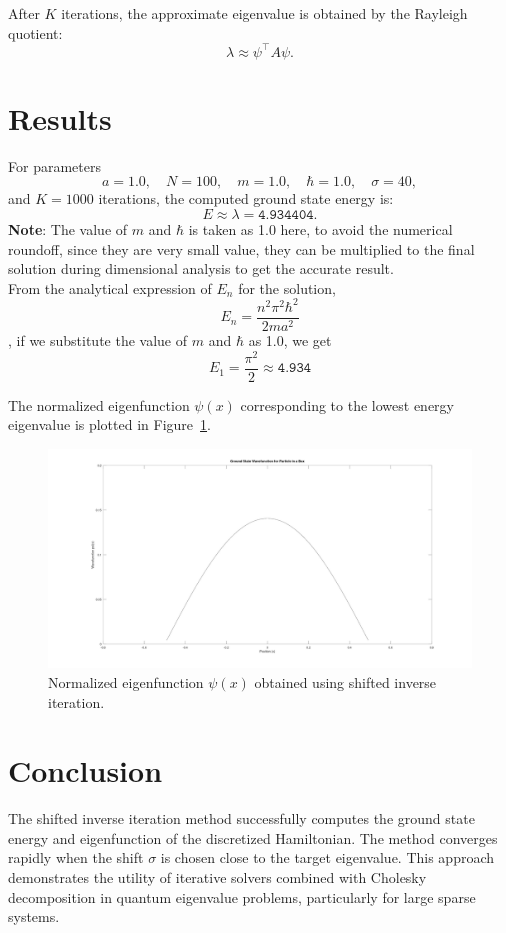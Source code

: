 After $K$ iterations, the approximate eigenvalue is obtained by the Rayleigh quotient:
\[
  \lambda \approx \psi^\top A \psi.
\]

\section*{Results}
For parameters
\[
a = 1.0, \quad N = 100, \quad m = 1.0, \quad \hbar = 1.0, \quad \sigma = 40,
\]
and $K = 1000$ iterations, the computed ground state energy is:
\[
  E \approx \lambda = \texttt{4.934404}.
\]
\textbf{Note}: The value of $m$ and $\hbar$ is taken as 1.0 here, to avoid the numerical roundoff, since they are very small value, they can be multiplied to the final solution during dimensional analysis to get the accurate result. \\
\vspace{10pt}
From the analytical expression of $E_{n}$ for the solution,
\[
  E_{n} = \frac{n^{2}\pi^{2}\hbar^{2}}{2ma^{2}}
\]
, if we substitute the value of $m$ and $\hbar$ as 1.0, we get
\[
  E_{1} = \frac{\pi^{2}}{2} \approx \texttt{4.934}
\]

The normalized eigenfunction $\psi(x)$ corresponding to the lowest energy eigenvalue is plotted in Figure~\ref{fig:a3}.

\begin{figure}[h!]
  \centering
  \includegraphics[width=1.0\textwidth]{a3.jpg}
  \caption{Normalized eigenfunction $\psi(x)$ obtained using shifted inverse iteration.}
  \label{fig:a3}
\end{figure}

\section*{Conclusion}
The shifted inverse iteration method successfully computes the ground state energy and eigenfunction of the discretized Hamiltonian. The method converges rapidly when the shift $\sigma$ is chosen close to the target eigenvalue. This approach demonstrates the utility of iterative solvers combined with Cholesky decomposition in quantum eigenvalue problems, particularly for large sparse systems.
